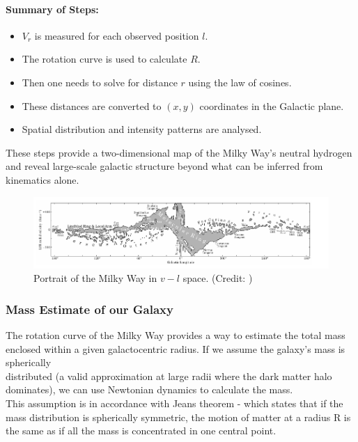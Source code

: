 \documentclass[12pt,a4paper]{article}
\begin{document}
\paragraph{Summary of Steps:}
\begin{itemize}
    \item $V_r$ is measured for each observed position $l$.
    \item The rotation curve is used to calculate $R$.
    \item Then one needs to solve for distance $r$ using the law of cosines.
    \item These distances are converted to $(x, y)$ coordinates in the Galactic plane.
    \item Spatial distribution and intensity patterns are analysed.
\end{itemize}

These steps provide a two-dimensional map of the Milky Way's neutral hydrogen and reveal large-scale galactic structure beyond what can be inferred from kinematics alone.
\begin{figure}[H]
  \centering
  \includegraphics[width=1.0\textwidth]{Pictures/map.png}
  \caption{Portrait of the Milky Way in $v - l$ space. (Credit: \cite{MWMC})}
  \label{fig:map}
\end{figure} 


    \subsubsection*{Mass Estimate of our Galaxy}

The rotation curve of the Milky Way provides a way to estimate the total mass enclosed within a given galactocentric radius. If we assume the galaxy’s mass is spherically \\ distributed (a valid approximation at large radii where the dark matter halo dominates), we can use Newtonian dynamics to calculate the mass. \\ This assumption is in accordance with Jeans theorem - which states that if the mass distribution is spherically symmetric, the motion of matter at a radius R is the same as if all the mass is concentrated in one central point.
\end{document}
